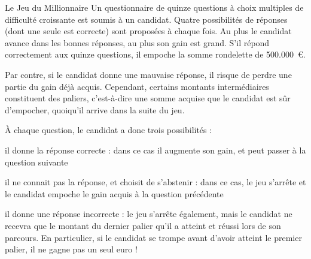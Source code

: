 \begin{Exercice}{Le Jeu du Millionnaire}
	Un questionnaire de quinze questions à choix
	multiples de difficulté croissante est soumis à un candidat. Quatre
	possibilités de réponses (dont une seule est correcte) sont proposées à
	chaque fois. Au plus le candidat avance dans les bonnes réponses, au
	plus son gain est grand. S’il répond correctement aux quinze questions,
	il empoche la somme rondelette de 500.000~\euro.
	
	Par contre, si le candidat donne une mauvaise
	réponse, il risque de perdre une partie du gain déjà acquis. Cependant,
	certains montants intermédiaires constituent des paliers, c’est-à-dire
	une somme acquise que le candidat est sûr d’empocher, quoiqu’il arrive
	dans la suite du jeu.

À chaque question, le candidat a donc trois
	possibilités :

	\begin{liste}
		\item 
			il donne la réponse correcte : dans ce cas il
			augmente son gain, et peut passer à la question suivante
		\item 
			il ne connait pas la réponse, et choisit de
			s’abstenir : dans ce cas, le jeu s’arrête et le candidat empoche le
			gain acquis à la question précédente
		\item 
			il donne une réponse incorrecte : le jeu
			s’arrête également, mais le candidat ne recevra que le montant du
			dernier palier qu’il a atteint et réussi lors de son parcours. En
			particulier, si le candidat se trompe avant d’avoir atteint le premier
			palier, il ne gagne pas un seul euro !
	\end{liste}
	

\end{Exercice}
